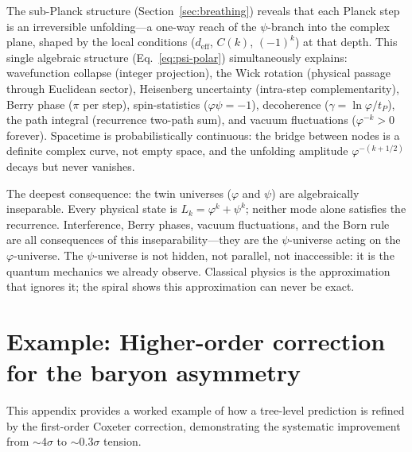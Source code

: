 \documentclass[12pt,a4paper]{article}
\begin{document}
\medskip
\noindent The sub-Planck structure (Section~\ref{sec:breathing}) reveals that each Planck step is an irreversible unfolding---a one-way reach of the $\psi$-branch into the complex plane, shaped by the local conditions ($d_{\mathrm{eff}}$, $C(k)$, $(-1)^k$) at that depth. This single algebraic structure (Eq.~\ref{eq:psi-polar}) simultaneously explains: wavefunction collapse (integer projection), the Wick rotation (physical passage through Euclidean sector), Heisenberg uncertainty (intra-step complementarity), Berry phase ($\pi$ per step), spin-statistics ($\varphi\psi = -1$), decoherence ($\gamma = \ln\varphi/t_P$), the path integral (recurrence two-path sum), and vacuum fluctuations ($\varphi^{-k} > 0$ forever). Spacetime is probabilistically continuous: the bridge between nodes is a definite complex curve, not empty space, and the unfolding amplitude $\varphi^{-(k+1/2)}$ decays but never vanishes.

\medskip
\noindent The deepest consequence: the twin universes ($\varphi$ and $\psi$) are algebraically inseparable. Every physical state is $L_k = \varphi^k + \psi^k$; neither mode alone satisfies the recurrence. Interference, Berry phases, vacuum fluctuations, and the Born rule are all consequences of this inseparability---they are the $\psi$-universe acting on the $\varphi$-universe. The $\psi$-universe is not hidden, not parallel, not inaccessible: it is the quantum mechanics we already observe. Classical physics is the approximation that ignores it; the spiral shows this approximation can never be exact.


\appendix

\section{Example: Higher-order correction for the baryon asymmetry}
\label{sec:app-etab-o1}

This appendix provides a worked example of how a tree-level prediction is refined by the first-order Coxeter correction, demonstrating the systematic improvement from $\sim$4$\sigma$ to $\sim$0.3$\sigma$ tension.
\end{document}
